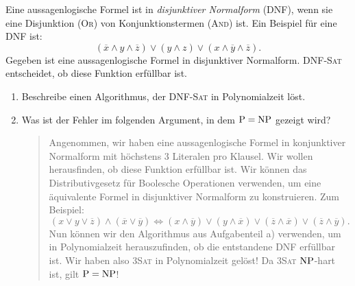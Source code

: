 \documentclass{uebung_cs}
\begin{document}
\begin{aufgabe}
	Eine aussagenlogische Formel ist in \textit{disjunktiver Normalform} (DNF), wenn sie eine Disjunktion (\textsc{Or}) von Konjunktionstermen (\textsc{And}) ist. Ein Beispiel für eine DNF ist:
	$$(\overline{x} \wedge y \wedge \overline{z}) \vee (y \wedge z) \vee (x \wedge \overline{y} \wedge \overline{z}).$$
	Gegeben ist eine aussagenlogische Formel in disjunktiver Normalform. DNF-\textsc{Sat} entscheidet, ob diese Funktion erfüllbar ist.
	\begin{enumerate}
		\item Beschreibe einen Algorithmus, der DNF-\textsc{Sat} in Polynomialzeit  löst.
		\item Was ist der Fehler im folgenden Argument, in dem $\mathrm{P} = \mathrm{NP}$ gezeigt wird?
		\begin{quote}
			Angenommen, wir haben eine aussagenlogische Formel in konjunktiver Normalform mit höchstens 3 Literalen pro Klausel. Wir wollen herausfinden, ob diese Funktion erfüllbar ist. Wir können das Distributivgesetz für Boolesche Operationen verwenden, um eine äquivalente Formel in disjunktiver Normalform zu konstruieren. Zum Beispiel:
			$$(x \vee y \vee \overline{z}) \wedge (\overline{x} \vee \overline{y}) \Leftrightarrow (x \wedge \overline{y}) \vee (y \wedge \overline{x}) \vee (\overline{z} \wedge \overline{x}) \vee (\overline{z} \wedge \overline{y}).$$
			Nun können wir den Algorithmus aus Aufgabenteil a) verwenden, um in Polynomialzeit herauszufinden, ob die entstandene DNF erfüllbar ist. Wir haben also \textsc{3Sat} in Polynomialzeit gelöst! Da \textsc{3Sat} $\mathrm{NP}$-hart ist, gilt $\mathrm{P} = \mathrm{NP}$!	
		\end{quote}
	\end{enumerate}	 
\end{aufgabe}
\end{document}
